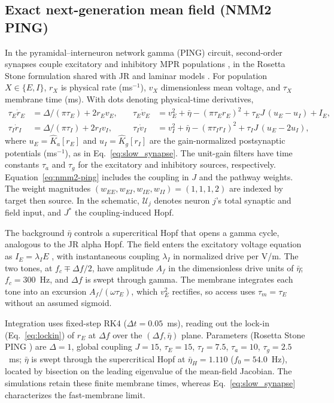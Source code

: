 \documentclass[a4paper]{article}
\begin{document}
\subsection{Exact next-generation mean field (NMM2 PING)}\label{sec:nmm2-methods}
In the pyramidal--interneuron network gamma (PING) circuit, second-order synapses
couple excitatory and inhibitory MPR populations
\cite{montbrio2015,ruffini2021nmm2,clusella2023}, in the Rosetta Stone
formulation shared with JR and laminar models \cite{ruffini2025rosetta}.
For population $X\in\{E,I\}$, $r_X$ is physical rate (ms$^{-1}$),
$v_X$ dimensionless mean voltage, and $\tau_X$ membrane time (ms).
With dots denoting physical-time derivatives,
\begin{equation}
\begin{aligned}
\tau_E\dot r_E&=\Delta/(\pi\tau_E)+2r_Ev_E, &\quad
\tau_E\dot v_E&=v_E^2+\bar\eta-(\pi\tau_E r_E)^2+\tau_E J\,(u_E-u_I)+I_E,\\[2pt]
\tau_I\dot r_I&=\Delta/(\pi\tau_I)+2r_Iv_I, &\quad
\tau_I\dot v_I&=v_I^2+\bar\eta-(\pi\tau_I r_I)^2+\tau_I J\,(u_E-2u_I),
\end{aligned}
\label{eq:nmm2-ping}
\end{equation}
where $u_E=\hat K_a[r_E]$ and $u_I=\hat K_g[r_I]$ are the gain-normalized
postsynaptic potentials (ms$^{-1}$), as in Eq.~\eqref{eq:slow_synapse}. The unit-gain filters have time constants
$\tau_a$ and $\tau_g$ for the excitatory and inhibitory sources, respectively.
Equation~\eqref{eq:nmm2-ping} includes
the coupling in $J$ and the pathway weights. The weight magnitudes
$(w_{EE},w_{EI},w_{IE},w_{II})=(1,1,1,2)$ are indexed by target then source.
In the schematic, $\mathcal U_j$ denotes
neuron $j$'s total synaptic and field input, and $J^*$ the coupling-induced Hopf.

The background $\bar\eta$ controls a supercritical Hopf that opens a gamma cycle,
analogous to the JR alpha Hopf. The field enters the excitatory voltage equation as
$I_E=\lambda_I E$ \cite{ruffini2021nmm2}, with instantaneous coupling $\lambda_I$ in
normalized drive per V/m. The two tones, at $f_c\mp\Delta f/2$, have amplitude
$A_f$ in the dimensionless drive units of $\bar\eta$; $f_c=300$~Hz, and $\Delta f$
is swept through gamma. The membrane integrates each tone into an excursion
$A_f/(\omega\tau_E)$, which $v_E^2$ rectifies, so access uses $\tau_m=\tau_E$ without
an assumed sigmoid.

Integration uses fixed-step RK4 ($\Delta t=0.05$~ms), reading out the lock-in
(Eq.~\eqref{eq:lockin}) of $r_E$ at $\Delta f$ over the $(\Delta f, \bar\eta)$ plane.
Parameters (Rosetta Stone PING \cite{ruffini2025rosetta}) are $\Delta=1$, global
coupling $J=15$, $\tau_E=15$, $\tau_I=7.5$, $\tau_a=10$, $\tau_g=2.5$~ms;
$\bar\eta$ is swept through the supercritical Hopf at $\bar\eta_H=1.110$
($f_0=54.0$~Hz), located by bisection on the leading eigenvalue of the mean-field
Jacobian. The simulations retain these finite membrane times, whereas
Eq.~\eqref{eq:slow_synapse} characterizes the fast-membrane limit.
\end{document}
